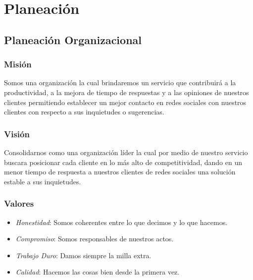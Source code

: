 \chapter{Planeaci\'on}
\section{Planeaci\'on Organizacional}
\subsection{Misi\'on}
Somos una organizaci\'on la cual brindaremos un servicio que  contribuir\'a a la productividad, a la mejora de tiempo de respuestas y a las opiniones de nuestros clientes permitiendo establecer un mejor contacto en redes sociales con nuestros clientes con respecto a sus inquietudes o sugerencias.%
%
\subsection{Visi\'on}
Consolidarnos como una organizaci\'on l\'ider la cual por medio de nuestro servicio buscara posicionar cada cliente en lo m\'as alto de competitividad,  dando en un menor tiempo de respuesta a nuestros clientes de redes sociales una soluci\'on estable a sus inquietudes.%
%
\subsection{Valores}
\begin{itemize}
\item \emph{Honestidad}: Somos coherentes entre lo que decimos y lo que hacemos.%
\item \emph{Compromiso}: Somos responsables de nuestros actos.%
\item \emph{Trabajo Duro}: Damos siempre la milla extra.%
\item \emph{Calidad}: Hacemos las cosas bien desde la primera vez.%
\end{itemize}
%
